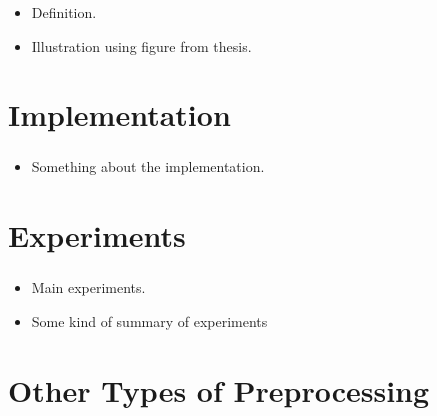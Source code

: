 \documentclass[english,notes]{beamer}
\begin{document}
\begin{frame}
  \frametitle{\insertsection}
  \begin{itemize}
    \tiny
  \item Definition.
  \item Illustration using figure from thesis.
  \end{itemize}
\end{frame}

\section{Implementation}

\begin{frame}
  \frametitle{\insertsection}
  \begin{itemize}
    \tiny
  \item Something about the implementation.
  \end{itemize}
\end{frame}

\section{Experiments}

\begin{frame}
  \frametitle{\insertsection}
  \begin{itemize}
    \tiny
  \item Main experiments.
  \item Some kind of summary of experiments
  \end{itemize}
\end{frame}

\section{Other Types of Preprocessing}

\begin{frame}
  \frametitle{\insertsection}

\end{frame}
\end{document}

